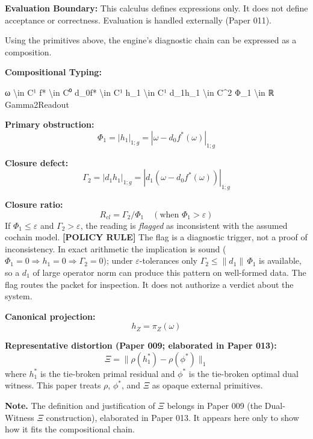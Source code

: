 \documentclass[
]{article}
\newenvironment{Shaded}{\begin{snugshade}}{\end{snugshade}}
\newcommand{\NormalTok}[1]{\textcolor[rgb]{0.12,0.11,0.11}{#1}}
\renewenvironment{quote}
  {\begin{leftbar}\small}
  {\end{leftbar}}
\begin{document}
\begin{quote}
\textbf{Evaluation Boundary:} This calculus defines expressions only. It does not define acceptance or correctness. Evaluation is handled externally (Paper 011).
\end{quote}

Using the primitives above, the engine's diagnostic chain can be expressed as a composition.

\textbf{Compositional Typing:}

\begin{Shaded}
\begin{Highlighting}[]
\NormalTok{ω \textbackslash{}in C¹}
\NormalTok{f* \textbackslash{}in C⁰}
\NormalTok{d\_0f* \textbackslash{}in C¹}
\NormalTok{h\_1 \textbackslash{}in C¹}
\NormalTok{d\_1h\_1 \textbackslash{}in C\^{}2}
\NormalTok{Φ\_1 \textbackslash{}in ℝ}
\NormalTok{Gamma2Readout}
\end{Highlighting}
\end{Shaded}

\textbf{Primary obstruction:}
\[
\Phi_1 = |h_1|_{1;g} = |\omega - d_0 f^*(\omega)|_{1;g}
\]

\textbf{Closure defect:}
\[
\Gamma_2 = |d_1 h_1|_{1;g} = |d_1(\omega - d_0 f^*(\omega))|_{1;g}
\]

\textbf{Closure ratio:}
\[
R_{cl} = \Gamma_2 / \Phi_1 \quad (\text{when } \Phi_1 > \varepsilon)
\]
If \(\Phi_1 \le \varepsilon\) and \(\Gamma_2 > \varepsilon\), the reading is \emph{flagged} as inconsistent with the assumed cochain model. \textbf{{[}POLICY RULE{]}} The flag is a diagnostic trigger, not a proof of inconsistency. In exact arithmetic the implication is sound (\(\Phi_1=0\Rightarrow h_1=0\Rightarrow\Gamma_2=0\)); under \(\varepsilon\)-tolerances only \(\Gamma_2\le\|d_1\|\,\Phi_1\) is available, so a \(d_1\) of large operator norm can produce this pattern on well-formed data. The flag routes the packet for inspection. It does not authorize a verdict about the system.

\textbf{Canonical projection:}
\[
h_Z = \pi_Z(\omega)
\]

\textbf{Representative distortion (\to Paper 009; elaborated in Paper 013):}
\[
\Xi = \|\rho(h_1^*)-\rho(\phi^*)\|_1
\]
where \(h_1^*\) is the tie-broken primal residual and \(\phi^*\) is the tie-broken optimal dual witness. This paper treats \(\rho\), \(\phi^*\), and \(\Xi\) as opaque external primitives.

\begin{quote}
\textbf{Note.} The definition and justification of \(\Xi\) belongs in Paper 009 (the Dual-Witness \(\Xi\) construction), elaborated in Paper 013. It appears here only to show how it fits the compositional chain.
\end{quote}
\end{document}
